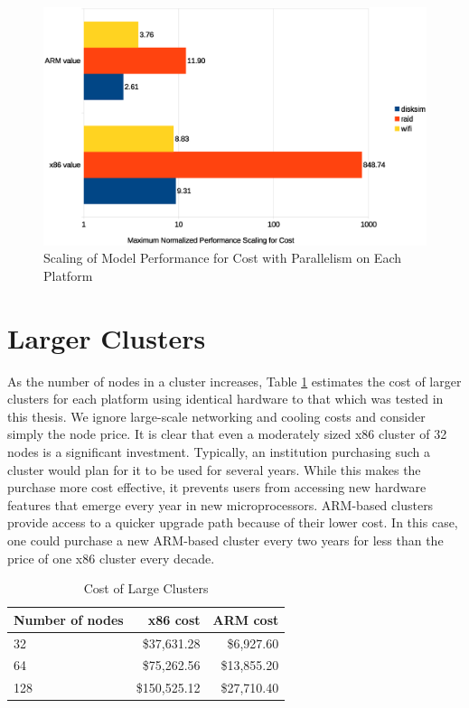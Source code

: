 \documentclass[11pt]{book}
\begin{document}
\begin{figure}
\centering
\includegraphics[width=\textwidth]{costperf_summary}
\caption{Scaling of Model Performance for Cost with Parallelism on Each Platform}
\label{costperf-summary}
\end{figure}


\section{Larger Clusters}

As the number of nodes in a cluster increases, Table \ref{cost-table} estimates the cost
of larger clusters for each platform using identical hardware to that which was tested in
this thesis.  We ignore large-scale networking and cooling costs and consider simply the
node price.  It is clear that even a moderately sized x86 cluster of 32 nodes is a
significant investment.  Typically, an institution purchasing such a cluster would plan
for it to be used for several years.  While this makes the purchase more cost effective,
it prevents users from accessing new hardware features that emerge every year in new
microprocessors.  ARM-based clusters provide access to a quicker upgrade path because of
their lower cost.  In this case, one could purchase a new ARM-based cluster every two
years for less than the price of one x86 cluster every decade.

\begin{table}[h]
\caption{Cost of Large Clusters}
\label{cost-table}
\centering
\begin{tabular}{| l | r | r |}
  \hline
  Number of nodes & x86 cost & ARM cost \\
  \hline
  32 & \$37,631.28 & \$6,927.60 \\
  64 & \$75,262.56 & \$13,855.20 \\
  128 & \$150,525.12 & \$27,710.40 \\
  \hline
\end{tabular}
\end{table}
\end{document}
